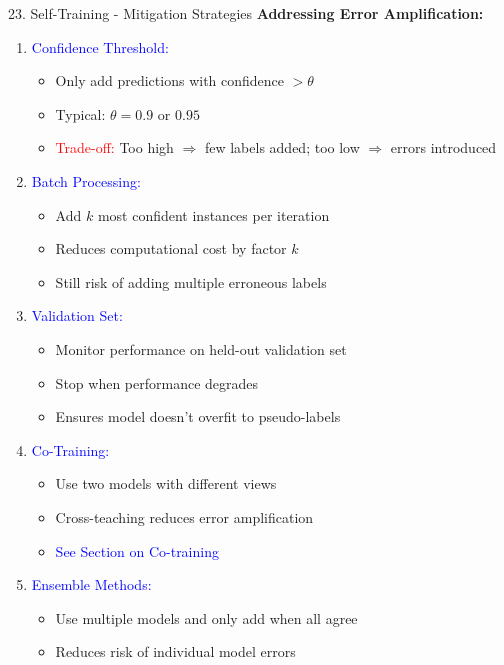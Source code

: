 \documentclass[8pt]{beamer}
\begin{document}
	\begin{frame}{23. Self-Training - Mitigation Strategies}
		\fontsize{6.5}{7.5}\selectfont
		\textbf{Addressing Error Amplification:}
		
		\begin{enumerate}
			\item \textcolor{blue}{Confidence Threshold:}
			\begin{itemize}
				\item Only add predictions with confidence $> \theta$
				\item Typical: $\theta = 0.9$ or $0.95$
				\item \textcolor{red}{Trade-off:} Too high $\Rightarrow$ few labels added; too low $\Rightarrow$ errors introduced
			\end{itemize}
			
			\item \textcolor{blue}{Batch Processing:}
			\begin{itemize}
				\item Add $k$ most confident instances per iteration
				\item Reduces computational cost by factor $k$
				\item Still risk of adding multiple erroneous labels
			\end{itemize}
			
			\item \textcolor{blue}{Validation Set:}
			\begin{itemize}
				\item Monitor performance on held-out validation set
				\item Stop when performance degrades
				\item Ensures model doesn't overfit to pseudo-labels
			\end{itemize}
			
			\item \textcolor{blue}{Co-Training:}
			\begin{itemize}
				\item Use two models with different views
				\item Cross-teaching reduces error amplification
				\item \textcolor{blue}{See Section on Co-training}
			\end{itemize}
			
			\item \textcolor{blue}{Ensemble Methods:}
			\begin{itemize}
				\item Use multiple models and only add when all agree
				\item Reduces risk of individual model errors
			\end{itemize}
		\end{enumerate}
	\end{frame}
	
\end{document}
